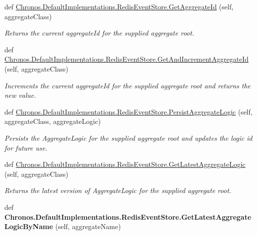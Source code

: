 \begin{DoxyCompactItemize}
\item 
def \hyperlink{group__Chronos_gacf07457d7fc86a6c7288d0776a232232}{Chronos.\+Default\+Implementations.\+Redis\+Event\+Store.\+Get\+Aggregate\+Id} (self, aggregate\+Class)
\begin{DoxyCompactList}\small\item\em Returns the current aggregate\+Id for the supplied aggregate root. \end{DoxyCompactList}\item 
def \hyperlink{group__Chronos_gaf6e4ec22098eba3836bb08becb8040bd}{Chronos.\+Default\+Implementations.\+Redis\+Event\+Store.\+Get\+And\+Increment\+Aggregate\+Id} (self, aggregate\+Class)
\begin{DoxyCompactList}\small\item\em Increments the current aggregate\+Id for the supplied aggregate root and returns the new value. \end{DoxyCompactList}\item 
def \hyperlink{group__Chronos_ga631470897d4a55e95820e08484f71135}{Chronos.\+Default\+Implementations.\+Redis\+Event\+Store.\+Persist\+Aggregate\+Logic} (self, aggregate\+Class, aggregate\+Logic)
\begin{DoxyCompactList}\small\item\em Persists the Aggregate\+Logic for the supplied aggregate root and updates the logic id for future use. \end{DoxyCompactList}\item 
def \hyperlink{group__Chronos_ga651c31b6887827043503061a23dfdba7}{Chronos.\+Default\+Implementations.\+Redis\+Event\+Store.\+Get\+Latest\+Aggregate\+Logic} (self, aggregate\+Class)
\begin{DoxyCompactList}\small\item\em Returns the latest version of Aggregate\+Logic for the supplied aggregate root. \end{DoxyCompactList}\item 
def {\bfseries Chronos.\+Default\+Implementations.\+Redis\+Event\+Store.\+Get\+Latest\+Aggregate\+Logic\+By\+Name} (self, aggregate\+Name)\hypertarget{group__Chronos_ga9415f05bd237ca7608c7e677b1da46b8}{}\label{group__Chronos_ga9415f05bd237ca7608c7e677b1da46b8}


\end{DoxyCompactItemize}
